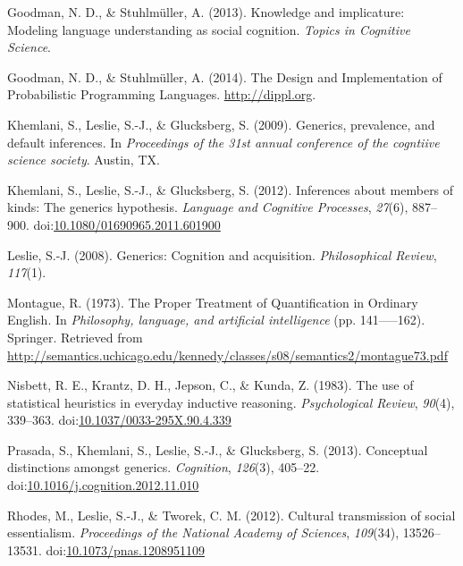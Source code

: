 \documentclass[,man,floatsintext]{apa6}
\theoremstyle{definition}
\theoremstyle{definition}
\theoremstyle{definition}
\theoremstyle{remark}
\begin{document}
\leavevmode\hypertarget{ref-Goodman2013}{}%
Goodman, N. D., \& Stuhlmüller, A. (2013). Knowledge and implicature:
Modeling language understanding as social cognition. \emph{Topics in
Cognitive Science}.

\leavevmode\hypertarget{ref-dippl}{}%
Goodman, N. D., \& Stuhlmüller, A. (2014). The Design and Implementation
of Probabilistic Programming Languages. \url{http://dippl.org}.

\leavevmode\hypertarget{ref-Khemlani2009}{}%
Khemlani, S., Leslie, S.-J., \& Glucksberg, S. (2009). Generics,
prevalence, and default inferences. In \emph{Proceedings of the 31st
annual conference of the cogntiive science society}. Austin, TX.

\leavevmode\hypertarget{ref-Khemlani2012}{}%
Khemlani, S., Leslie, S.-J., \& Glucksberg, S. (2012). Inferences about
members of kinds: The generics hypothesis. \emph{Language and Cognitive
Processes}, \emph{27}(6), 887--900.
doi:\href{https://doi.org/10.1080/01690965.2011.601900}{10.1080/01690965.2011.601900}

\leavevmode\hypertarget{ref-Leslie2008}{}%
Leslie, S.-J. (2008). Generics: Cognition and acquisition.
\emph{Philosophical Review}, \emph{117}(1).

\leavevmode\hypertarget{ref-Montague1973}{}%
Montague, R. (1973). The Proper Treatment of Quantification in Ordinary
English. In \emph{Philosophy, language, and artificial intelligence}
(pp. 141-----162). Springer. Retrieved from
\url{http://semantics.uchicago.edu/kennedy/classes/s08/semantics2/montague73.pdf}

\leavevmode\hypertarget{ref-Nisbett1983}{}%
Nisbett, R. E., Krantz, D. H., Jepson, C., \& Kunda, Z. (1983). The use
of statistical heuristics in everyday inductive reasoning.
\emph{Psychological Review}, \emph{90}(4), 339--363.
doi:\href{https://doi.org/10.1037/0033-295X.90.4.339}{10.1037/0033-295X.90.4.339}

\leavevmode\hypertarget{ref-Prasada2013}{}%
Prasada, S., Khemlani, S., Leslie, S.-J., \& Glucksberg, S. (2013).
Conceptual distinctions amongst generics. \emph{Cognition},
\emph{126}(3), 405--22.
doi:\href{https://doi.org/10.1016/j.cognition.2012.11.010}{10.1016/j.cognition.2012.11.010}

\leavevmode\hypertarget{ref-Rhodes2012}{}%
Rhodes, M., Leslie, S.-J., \& Tworek, C. M. (2012). Cultural
transmission of social essentialism. \emph{Proceedings of the National
Academy of Sciences}, \emph{109}(34), 13526--13531.
doi:\href{https://doi.org/10.1073/pnas.1208951109}{10.1073/pnas.1208951109}
\end{document}
